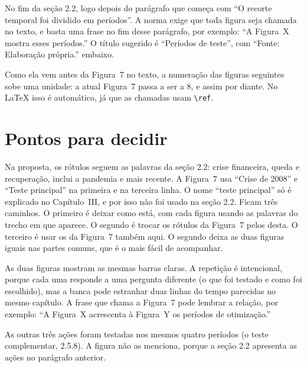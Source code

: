 \documentclass[11pt,a4paper]{article}
\begin{document}
No fim da seção 2.2, logo depois do parágrafo que começa com ``O recorte temporal
foi dividido em períodos''. A norma exige que toda figura seja chamada no texto, e
basta uma frase no fim desse parágrafo, por exemplo: ``A Figura~X mostra esses
períodos.'' O título sugerido é ``Períodos de teste'', com ``Fonte: Elaboração
própria.'' embaixo.

Como ela vem antes da Figura~7 no texto, a numeração das figuras seguintes sobe uma
unidade: a atual Figura~7 passa a ser a 8, e assim por diante. No LaTeX isso é
automático, já que as chamadas usam \verb|\ref|.

\section{Pontos para decidir}

\begin{cuidado}
Na proposta, os rótulos seguem as palavras da seção 2.2: crise financeira, queda e
recuperação, inclui a pandemia e mais recente. A Figura~7 usa ``Crise de 2008'' e
``Teste principal'' na primeira e na terceira linha. O nome ``teste
principal'' só é explicado no Capítulo~III, e por isso não foi usado na seção 2.2.
Ficam três caminhos. O primeiro é deixar como está, com cada figura usando as
palavras do trecho em que aparece. O segundo é trocar os rótulos da Figura~7 pelos
desta. O terceiro é usar os da Figura~7 também aqui. O segundo deixa as duas
figuras iguais nas partes comuns, que é o mais fácil de acompanhar.
\end{cuidado}

\begin{cuidado}[Repetição]
As duas figuras mostram as mesmas barras claras. A repetição é intencional, porque
cada uma responde a uma pergunta diferente (o que foi testado e como foi escolhido),
mas a banca pode estranhar duas linhas do tempo parecidas no mesmo capítulo. A frase
que chama a Figura~7 pode lembrar a relação, por exemplo: ``A Figura~X acrescenta à
Figura~Y os períodos de otimização.''
\end{cuidado}

As outras três ações foram testadas nos mesmos quatro períodos (o teste
complementar, 2.5.8). A figura não as menciona, porque a seção 2.2 apresenta as
ações no parágrafo anterior.
\end{document}

